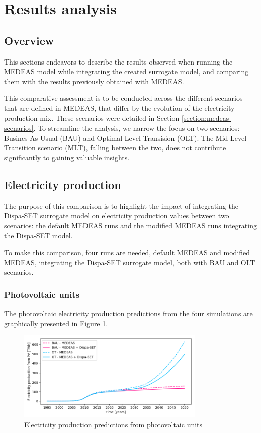 \section{Results analysis}

\subsection{Overview}

This sections endeavors to describe the results observed when running the MEDEAS model while integrating the created surrogate model, and comparing them with the results previously obtained with MEDEAS.

This comparative assessment is to be conducted across the different scenarios that are defined in MEDEAS, that differ by the evolution of the electricity production mix. These scenarios were detailed in Section \ref{section:medeas-scenarios}. To streamline the analysis, we narrow the focus on two scenarios: Busines As Usual (BAU) and Optimal Level Transision (OLT). The Mid-Level Transition scenario (MLT), falling between the two, does not contribute significantly to gaining valuable insights.

\subsection{Electricity production}

The purpose of this comparison is to highlight the impact of integrating the Dispa-SET surrogate model on electricity production values between two scenarios: the default MEDEAS runs and the modified MEDEAS runs integrating the Dispa-SET model.

To make this comparison, four runs are needed, default MEDEAS and modified MEDEAS, integrating the Dispa-SET surrogate model, both with BAU and OLT scenarios.

\subsubsection{Photovoltaic units}

The photovoltaic electricity production predictions from the four simulations are graphically presented in Figure \ref{fig:electricity-production-PV}.

\begin{figure}[h]
    \centering
    \includegraphics[width=0.8\textwidth]{resources/images/electricity-production_PV.png}
    \caption{Electricity production predictions from photovoltaic units}
    \label{fig:electricity-production-PV}
\end{figure}

